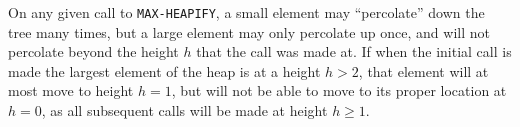 On any given call to \texttt{MAX-HEAPIFY}, a small element may ``percolate'' down the tree many times, but a large element may only percolate up once, and will not percolate beyond the height $h$ that the call was made at. If when the initial call is made the largest element of the heap is at a height $h > 2$, that element will at most move to height $h = 1$, but will not be able to move to its proper location at $h = 0$, as all subsequent calls will be made at height $h \geq 1$.
